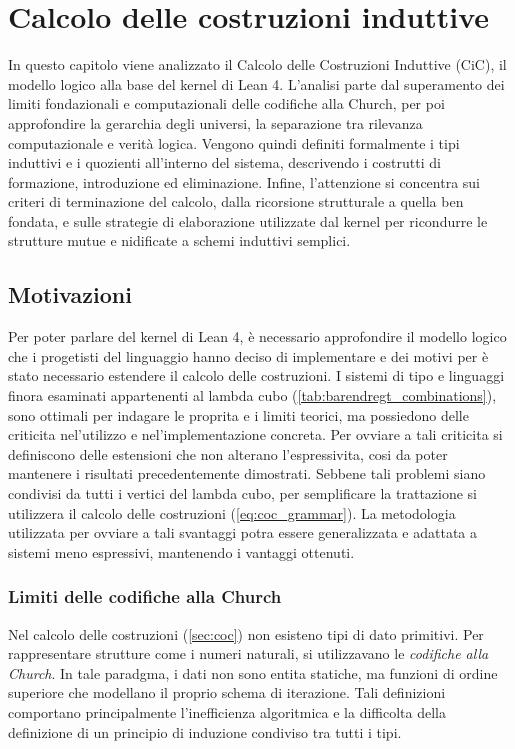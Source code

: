 \chapter{Calcolo delle costruzioni induttive}
\label{chap:cic}

In questo capitolo viene analizzato il Calcolo delle Costruzioni Induttive (CiC), il modello logico alla base del kernel di Lean 4. L'analisi parte 
dal superamento dei limiti fondazionali e computazionali delle codifiche alla Church, per poi approfondire la gerarchia degli universi, la separazione 
tra rilevanza computazionale e verità logica. Vengono quindi definiti formalmente i tipi induttivi e i quozienti all'interno del sistema, descrivendo i 
costrutti di formazione, introduzione ed eliminazione. Infine, l'attenzione si concentra sui criteri di terminazione del calcolo, dalla ricorsione strutturale 
a quella ben fondata, e sulle strategie di elaborazione utilizzate dal kernel per ricondurre le strutture mutue e nidificate a schemi induttivi semplici.

\section{Motivazioni}
Per poter parlare del kernel di Lean 4, è necessario approfondire il modello logico che i progetisti del linguaggio hanno deciso di implementare
e dei motivi per è stato necessario estendere il calcolo delle costruzioni. I sistemi di tipo e linguaggi finora esaminati appartenenti al lambda
cubo (\ref{tab:barendregt_combinations}), sono ottimali per indagare le proprita e i limiti teorici, ma possiedono delle criticita nel'utilizzo e 
nel'implementazione concreta. Per ovviare a tali criticita si definiscono delle estensioni che non alterano l'espressivita, cosi da poter mantenere
i risultati precedentemente dimostrati. Sebbene tali problemi siano condivisi da tutti i vertici del lambda cubo, per semplificare la trattazione
si utilizzera il calcolo delle costruzioni (\ref{eq:coc_grammar}). La metodologia utilizzata per ovviare a tali svantaggi potra essere generalizzata
e adattata a sistemi meno espressivi, mantenendo i vantaggi ottenuti.

\subsection{Limiti delle codifiche alla Church}
Nel calcolo delle costruzioni (\ref{sec:coc}) non esisteno tipi di dato primitivi. Per rappresentare strutture come i numeri naturali, si
utilizzavano le \emph{codifiche alla Church}. In tale paradgma, i dati non sono entita statiche, ma funzioni di ordine superiore che modellano
il proprio schema di iterazione. Tali definizioni comportano principalmente l'inefficienza algoritmica e la difficolta della definizione di un 
principio di induzione condiviso tra tutti i tipi.

